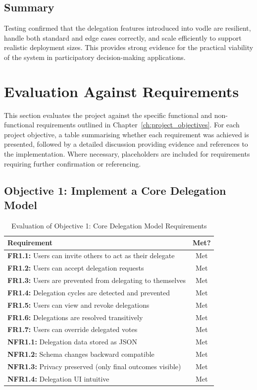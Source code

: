 \subsection*{Summary}
Testing confirmed that the delegation features introduced into vodle are resilient, handle both standard and edge cases correctly, and scale efficiently to support realistic deployment sizes. This provides strong evidence for the practical viability of the system in participatory decision-making applications.


\section{Evaluation Against Requirements}

This section evaluates the project against the specific functional and non-functional requirements outlined in Chapter~\ref{ch:project_objectives}. For each project objective, a table summarising whether each requirement was achieved is presented, followed by a detailed discussion providing evidence and references to the implementation. Where necessary, placeholders are included for requirements requiring further confirmation or referencing.

\subsection{Objective 1: Implement a Core Delegation Model}

\begin{table}[H]
\centering
\begin{tabular}{|p{9cm}|c|}
\hline
\textbf{Requirement} & \textbf{Met?} \\ \hline
\textbf{FR1.1:} Users can invite others to act as their delegate & Met \\ \hline
\textbf{FR1.2:} Users can accept delegation requests & Met \\ \hline
\textbf{FR1.3:} Users are prevented from delegating to themselves & Met \\ \hline
\textbf{FR1.4:} Delegation cycles are detected and prevented & Met \\ \hline
\textbf{FR1.5:} Users can view and revoke delegations & Met \\ \hline
\textbf{FR1.6:} Delegations are resolved transitively & Met \\ \hline
\textbf{FR1.7:} Users can override delegated votes & Met \\ \hline
\textbf{NFR1.1:} Delegation data stored as JSON & Met \\ \hline
\textbf{NFR1.2:} Schema changes backward compatible & Met \\ \hline
\textbf{NFR1.3:} Privacy preserved (only final outcomes visible) & Met \\ \hline
\textbf{NFR1.4:} Delegation UI intuitive & Met \\ \hline
\end{tabular}
\caption{Evaluation of Objective 1: Core Delegation Model Requirements}
\label{tab:objective1_requirements}
\end{table}

